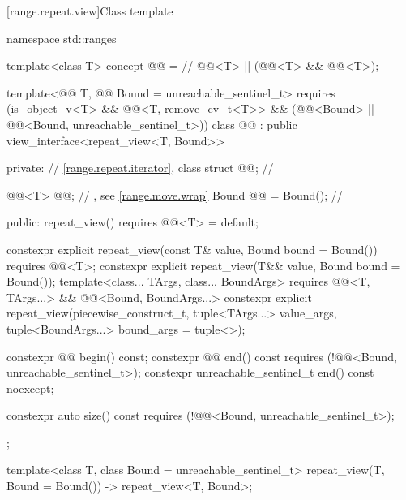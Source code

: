 [range.repeat.view]{Class template }

\begin{codeblock}
namespace std::ranges {
  template<class T>
    concept @@ =  // \expos
      @@<T> || (@@<T> && @@<T>);

  template<@@ T, @@ Bound = unreachable_sentinel_t>
    requires (is_object_v<T> && @@<T, remove_cv_t<T>> &&
              (@@<Bound> ||
               @@<Bound, unreachable_sentinel_t>))
  class @@ : public view_interface<repeat_view<T, Bound>> {
  private:
    // \ref{range.repeat.iterator}, class 
    struct @@;                            // \expos

    @@<T> @@;                      // \expos, see \ref{range.move.wrap}
    Bound @@ = Bound();                     // \expos

  public:
    repeat_view() requires @@<T> = default;

    constexpr explicit repeat_view(const T& value, Bound bound = Bound())
      requires @@<T>;
    constexpr explicit repeat_view(T&& value, Bound bound = Bound());
    template<class... TArgs, class... BoundArgs>
      requires @@<T, TArgs...> &&
               @@<Bound, BoundArgs...>
    constexpr explicit repeat_view(piecewise_construct_t,
      tuple<TArgs...> value_args, tuple<BoundArgs...> bound_args = tuple<>{});

    constexpr @@ begin() const;
    constexpr @@ end() const requires (!@@<Bound, unreachable_sentinel_t>);
    constexpr unreachable_sentinel_t end() const noexcept;

    constexpr auto size() const requires (!@@<Bound, unreachable_sentinel_t>);
  };

  template<class T, class Bound = unreachable_sentinel_t>
    repeat_view(T, Bound = Bound()) -> repeat_view<T, Bound>;
}
\end{codeblock}

